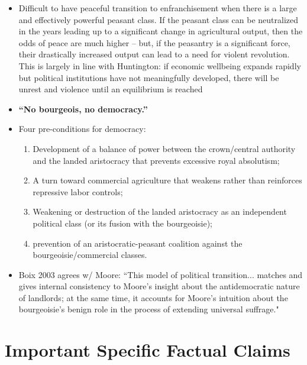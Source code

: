 \documentclass[12pt]{article}
\begin{document}
\begin{itemize}[leftmargin=*, itemsep=4pt]
    \item Difficult to have peaceful transition to enfranchisement when there is a large and effectively powerful peasant class. If the peasant class can be neutralized in the years leading up to a significant change in agricultural output, then the odds of peace are much higher -- but, if the peasantry is a significant force, their drastically increased output can lead to a need for violent revolution. This is largely in line with Huntington: if economic wellbeing expands rapidly but political institutions have not meaningfully developed, there will be unrest and violence until an equilibrium is reached
    \item \textbf{``No bourgeois, no democracy.''}
    \item Four pre-conditions for democracy:
    \begin{enumerate}
        \item Development of a balance of power between the crown/central authority and the landed aristocracy that prevents excessive royal absolutism;
        \item A turn toward commercial agriculture that weakens rather than reinforces repressive labor controls;
        \item Weakening or destruction of the landed aristocracy as an independent political class (or its fusion with the bourgeoisie);
        \item prevention of an aristocratic-peasant coalition against the bourgeoisie/commercial classes.
    \end{enumerate}
    \item Boix 2003 agrees w/ Moore: ``This model of political transition... matches and gives internal consistency to Moore's insight about the antidemocratic nature of landlords; at the same time, it accounts for Moore's intuition about the bourgeoisie's benign role in the process of extending universal suffrage."
\end{itemize}


\section{Important Specific Factual Claims}
\end{document}
